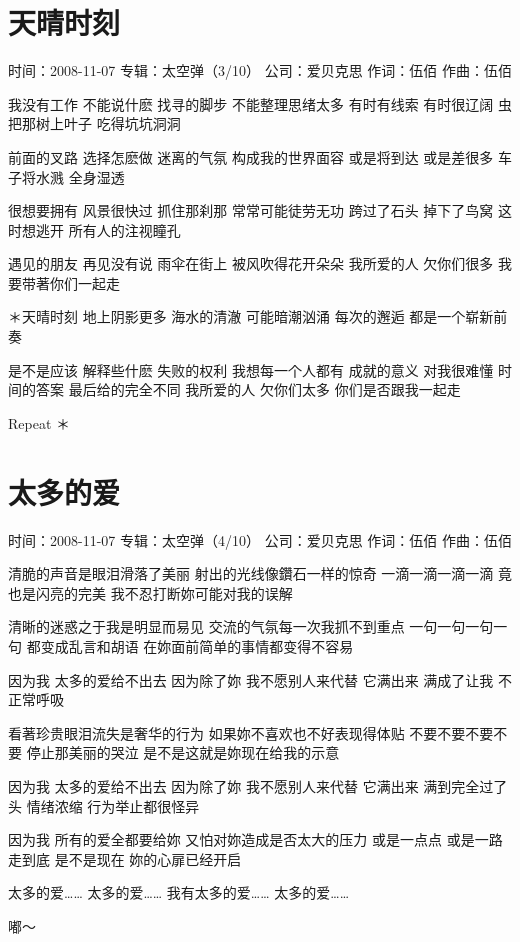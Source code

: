 \documentclass[UTF8,a4paper,oneside,twocolumn,12pt]{ctexbook}
\newcommand{\infopair}[2]{\textbullet #1：#2}
\newcommand{\zc}[1][伍佰]{\infopair{作词}{#1}}
\newcommand{\zq}[1][伍佰]{\infopair{作曲}{#1}}
\newcommand{\zj}[1]{\infopair{专辑}{#1}}
\newcommand{\sj}[1]{\infopair{时间}{#1}}
\newcommand{\gs}[1]{\infopair{公司}{#1}}
\newenvironment{info}{\begin{flushleft}\kaishu
	}
	{\end{flushleft}\normalsize\yahei\par}
\newenvironment{lyric}{
	}
{}
\begin{document}
\section{天晴时刻}
\begin{info}
	\sj{2008-11-07}
	\zj{太空弹（3/10）}
	\gs{爱贝克思}
	\zc
	\zq
\end{info}
\begin{lyric}
	我没有工作 不能说什麽
	找寻的脚步 不能整理思绪太多
	有时有线索 有时很辽阔
	虫把那树上叶子 吃得坑坑洞洞

	前面的叉路 选择怎麽做
	迷离的气氛 构成我的世界面容
	或是将到达 或是差很多
	车子将水溅 全身湿透

	很想要拥有 风景很快过
	抓住那刹那 常常可能徒劳无功
	跨过了石头 掉下了鸟窝
	这时想逃开 所有人的注视瞳孔

	遇见的朋友 再见没有说
	雨伞在街上 被风吹得花开朵朵
	我所爱的人 欠你们很多
	我要带著你们一起走

	＊天晴时刻 地上阴影更多
	海水的清澈 可能暗潮汹涌
	每次的邂逅 都是一个崭新前奏

	是不是应该 解释些什麽
	失败的权利 我想每一个人都有
	成就的意义 对我很难懂
	时间的答案 最后给的完全不同
	我所爱的人 欠你们太多
	你们是否跟我一起走

	Repeat ＊
\end{lyric}

\section{太多的爱}
\begin{info}
	\sj{2008-11-07}
	\zj{太空弹（4/10）}
	\gs{爱贝克思}
	\zc
	\zq
\end{info}
\begin{lyric}
	清脆的声音是眼泪滑落了美丽
	射出的光线像鑽石一样的惊奇
	一滴一滴一滴一滴
	竟也是闪亮的完美
	我不忍打断妳可能对我的误解

	清晰的迷惑之于我是明显而易见
	交流的气氛每一次我抓不到重点
	一句一句一句一句
	都变成乱言和胡语
	在妳面前简单的事情都变得不容易

	因为我 太多的爱给不出去
	因为除了妳 我不愿别人来代替
	它满出来 满成了让我 不正常呼吸

	看著珍贵眼泪流失是奢华的行为
	如果妳不喜欢也不好表现得体贴
	不要不要不要不要
	停止那美丽的哭泣
	是不是这就是妳现在给我的示意

	因为我 太多的爱给不出去
	因为除了妳 我不愿别人来代替
	它满出来 满到完全过了头
	情绪浓缩 行为举止都很怪异

	因为我 所有的爱全都要给妳
	又怕对妳造成是否太大的压力
	或是一点点 或是一路走到底
	是不是现在 妳的心扉已经开启

	太多的爱…… 太多的爱……
	我有太多的爱…… 太多的爱……

	嘟～
\end{lyric}
\end{document}
